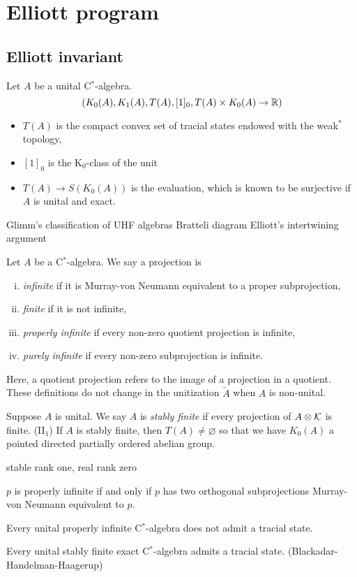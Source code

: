 \documentclass{../../large}
\begin{document}
\chapter{Elliott program}


\section{Elliott invariant}
Let $A$ be a unital C$^*$-algebra.
\[(K_0(A),K_1(A),T(A),[1]_0,T(A)\times K_0(A)\to\mathbb{R})\]
\begin{itemize}
\item $T(A)$ is the compact convex set of tracial states endowed with the weak$^*$ topology,
\item $[1]_0$ is the K$_0$-class of the unit
\item $T(A)\to S(K_0(A))$ is the evaluation, which is known to be surjective if $A$ is unital and exact.
\end{itemize}

Glimm's classification of UHF algebras
Bratteli diagram
Elliott's intertwining argument


\begin{prb}
Let $A$ be a C$^*$-algebra.
We say a projection is
\begin{enumerate}[(i)]
\item \emph{infinite} if it is Murray-von Neumann equivalent to a proper subprojection,
\item \emph{finite} if it is not infinite,
\item \emph{properly infinite} if every non-zero quotient projection is infinite,
\item \emph{purely infinite} if every non-zero subprojection is infinite.
\end{enumerate}
Here, a quotient projection refers to the image of a projection in a quotient.
These definitions do not change in the unitization $\tilde A$ when $A$ is non-unital.

Suppose $A$ is unital.
We say $A$ is \emph{stably finite} if every projection of $A\otimes\mathcal{K}$ is finite. (II$_1$)
If $A$ is stably finite, then $T(A)\ne\varnothing$ so that we have $K_0(A)$ a pointed directed partially ordered abelian group.

stable rank one, real rank zero

\begin{parts}
\item $p$ is properly infinite if and only if $p$ has two orthogonal subprojections Murray-von Neumann equivalent to $p$.
\item Every unital properly infinite C$^*$-algebra does not admit a tracial state.
\item Every unital stably finite exact C$^*$-algebra admits a tracial state. (Blackadar-Handelman-Haagerup)
\end{parts}
\end{prb}
\end{document}
